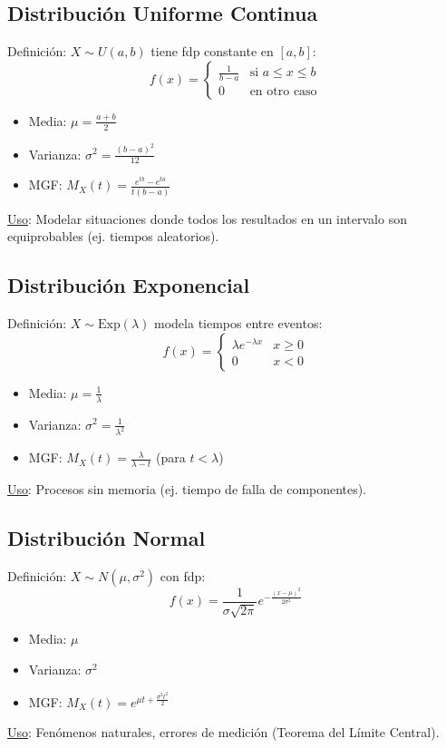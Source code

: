 \documentclass[letterpaper]{article}
\begin{document}
	\subsection{Distribución Uniforme Continua}
	Definición: $X \sim U(a, b)$ tiene fdp constante en $[a, b]$:
	\[ f(x) = \begin{cases} 
		\frac{1}{b-a} & \text{si } a \leq x \leq b \\
		0 & \text{en otro caso}
	\end{cases} \]
	\begin{itemize}
		\item Media: $\mu = \frac{a + b}{2}$
		\item Varianza: $\sigma^2 = \frac{(b - a)^2}{12}$
		\item MGF: $M_X(t) = \frac{e^{tb} - e^{ta}}{t(b - a)}$
	\end{itemize}
	\underline{Uso}: Modelar situaciones donde todos los resultados en un intervalo son equiprobables (ej. tiempos aleatorios).
	
	\subsection{Distribución Exponencial}
	Definición: $X \sim \text{Exp}(\lambda)$ modela tiempos entre eventos:
	\[ f(x) = \begin{cases} 
		\lambda e^{-\lambda x} & x \geq 0 \\
		0 & x < 0
	\end{cases} \]
	\begin{itemize}
		\item Media: $\mu = \frac{1}{\lambda}$
		\item Varianza: $\sigma^2 = \frac{1}{\lambda^2}$
		\item MGF: $M_X(t) = \frac{\lambda}{\lambda - t}$ (para $t < \lambda$)
	\end{itemize}
	\underline{Uso}: Procesos sin memoria (ej. tiempo de falla de componentes).
	
	\subsection{Distribución Normal}
	Definición: $X \sim N(\mu, \sigma^2)$ con fdp:
	\[ f(x) = \frac{1}{\sigma \sqrt{2\pi}} e^{-\frac{(x - \mu)^2}{2\sigma^2}} \]
	\begin{itemize}
		\item Media: $\mu$
		\item Varianza: $\sigma^2$
		\item MGF: $M_X(t) = e^{\mu t + \frac{\sigma^2 t^2}{2}}$
	\end{itemize}
	\underline{Uso}: Fenómenos naturales, errores de medición (Teorema del Límite Central).
	
\end{document}
